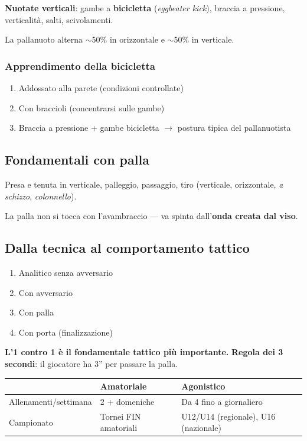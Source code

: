 \documentclass[12pt, a4paper]{article}
\begin{document}
\textbf{Nuotate verticali}: gambe a \textbf{bicicletta} (\textit{eggbeater kick}), braccia a pressione, verticalità, salti, scivolamenti.

La pallanuoto alterna $\sim$50\% in orizzontale e $\sim$50\% in verticale.

\subsubsection{Apprendimento della bicicletta}
\begin{enumerate}
  \item Addossato alla parete (condizioni controllate)
  \item Con braccioli (concentrarsi sulle gambe)
  \item Braccia a pressione + gambe bicicletta $\rightarrow$ postura tipica del pallanuotista
\end{enumerate}

\subsection{Fondamentali con palla}

Presa e tenuta in verticale, palleggio, passaggio, tiro (verticale, orizzontale, \textit{a schizzo}, \textit{colonnello}).

La palla non si tocca con l'avambraccio --- va spinta dall'\textbf{onda creata dal viso}.

\subsection{Dalla tecnica al comportamento tattico}

\begin{enumerate}
  \item Analitico senza avversario
  \item Con avversario
  \item Con palla
  \item Con porta (finalizzazione)
\end{enumerate}

\textbf{L'1 contro 1 è il fondamentale tattico più importante.} \textbf{Regola dei 3 secondi}: il giocatore ha 3'' per passare la palla.

\begin{tabularx}{\textwidth}{lXX}
\toprule
\rowcolor{light} & \textbf{Amatoriale} & \textbf{Agonistico} \\
\midrule
Allenamenti/settimana & 2 + domeniche & Da 4 fino a giornaliero \\
Campionato & Tornei FIN amatoriali & U12/U14 (regionale), U16 (nazionale) \\
\bottomrule
\end{tabularx}
\end{document}

